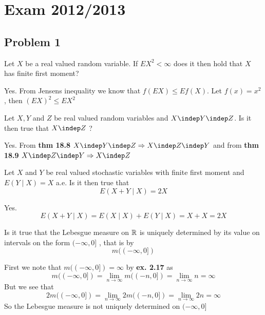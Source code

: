 
\section{Exam 2012/2013} %
\label{sec:exam_2012_2013}
\subsection{Problem 1} %
\begin{problem}
Let \(X\) be a real valued random variable. If \(EX^2<\infty\) does it then hold that \(X\) has finite first moment?
\end{problem}
\begin{solution}
Yes. From Jensens inequality we know that \(f(EX)\leq Ef(X)\). Let \(f(x)=x^2\), then \((EX)^2\leq EX^2\)
\end{solution}
\begin{problem}
Let \(X,Y\) and \(Z\) be real valued random variables and \(X\indep Y\indep Z\). Is it then true that \(X\indep Z\) ?
\end{problem}
\begin{solution}
Yes. From \textbf{thm 18.8} \(X\indep Y\indep Z \Rightarrow X\indep Z\indep Y\) and from \textbf{thm 18.9} \(X\indep Z\indep Y \Rightarrow X\indep Z\)
\end{solution}
\begin{problem}
Let \(X\) and \(Y\) be real valued stochastic variables with finite first moment and \(E(Y\mid X)=X\) a.e. Is it then true that
\[
	E(X+Y\mid X)=2X
\]
\end{problem}
\begin{solution}
Yes.
\[
	E(X+Y\mid X)=E(X\mid X)+E(Y\mid X)=X+X=2X
\]

\end{solution}
\begin{problem}
Is it true that the Lebesgue measure on \({\mathbb{R}}\) is uniquely determined by its value on intervals on the form \((-\infty,0]\) , that is by
\[
	m((-\infty,0])
\]
\end{problem}
\begin{solution}
First we note that \(m((-\infty,0])=\infty\) by \textbf{ex. 2.17} as
\[
	m((-\infty,0])=\lim_{n \rightarrow \infty}m((-n,0])=\lim_{n \rightarrow \infty}n=\infty
\]
But we see that
\[
 	2m((-\infty,0])=\lim_{n \rightarrow \infty}2m((-n,0])=\lim_{n \rightarrow \infty}2n=\infty
\]
 So the Lebesgue measure is not uniquely determined on \((-\infty,0]\)
\end{solution}
